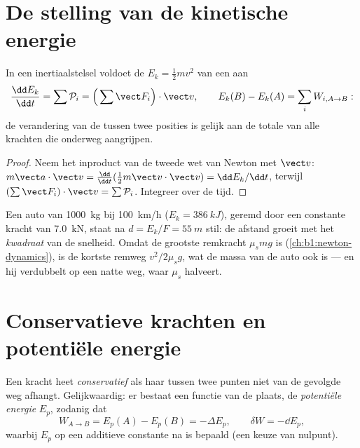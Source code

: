 \section{De stelling van de kinetische energie}

\begin{theorem}\label{thm:b1:work-and-energy:ke}
In een inertiaalstelsel voldoet de \emph{} $E_k = \tfrac12 mv^2$ van
een  aan
\[
\frac{\dd E_k}{\dd t} = \sum\mathcal P_i = \Big(\sum\vect F_i\Big)\cdot\vect v,
\qquad
E_k(B) - E_k(A) = \sum_i W_{i,A\to B}:
\]
de verandering van de  tussen twee posities is gelijk aan de totale 
van alle krachten die onderweg aangrijpen.
\end{theorem}

\begin{proof}
Neem het inproduct van de tweede wet van Newton met $\vect v$: $m\vect a\cdot\vect v =
\tfrac{\dd}{\dd t}(\tfrac12 m\vect v\cdot\vect v) = \dd E_k/\dd t$, terwijl
$(\sum\vect F_i)\cdot\vect v = \sum\mathcal P_i$. Integreer over de tijd.
\end{proof}

\begin{example}[Remweg]\label{ex:b1:work-and-energy:braking}
Een auto van \qty{1000}{kg} bij \qty{100}{km/h} ($E_k = \qty{386}{kJ}$), geremd door
een constante kracht van \qty{7.0}{kN}, staat na $d = E_k/F = \qty{55}{m}$ stil:
de afstand groeit met het \emph{kwadraat} van de snelheid. Omdat de
grootste remkracht $\mu_smg$ is (\cref{ch:b1:newton-dynamics}), is de
kortste remweg $v^2/2\mu_sg$, wat de massa van de auto ook is ---
en hij verdubbelt op een natte weg, waar $\mu_s$ halveert.
\end{example}

\section{Conservatieve krachten en potentiële energie}

\begin{definition}\label{def:b1:work-and-energy:conservative}
Een kracht heet \emph{conservatief} als haar  tussen twee punten niet
van de gevolgde weg afhangt. Gelijkwaardig: er bestaat een functie van
de plaats, de \emph{potentiële energie} $E_p$, zodanig dat
\[
W_{A\to B} = E_p(A) - E_p(B) = -\Delta E_p ,
\qquad \delta W = -\dd E_p ,
\]
waarbij $E_p$ op een additieve constante na is bepaald (een keuze van nulpunt).
\end{definition}

